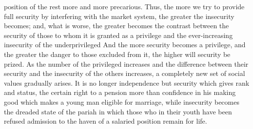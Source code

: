 \documentclass[11pt,openany]{book}
\begin{document}
position of the rest more and more precarious. Thus, the more we try to provide full security by interfering with the market system, the greater the insecurity becomes; and, what is worse, the greater becomes the contrast between the security of those to whom it is granted as a privilege and the ever-increasing insecurity of the underprivileged And the more security becomes a privilege, and the greater the danger to those excluded from it, the higher will security be prized. As the number of the privileged increases and the difference between their security and the insecurity of the others increases, a completely new set of social values gradually arises. It is no longer independence but security which gives rank and status, the certain right to a pension more than confidence in his making good which makes a young man eligible for marriage, while insecurity becomes the dreaded state of the pariah in which those who in their youth have been refused admission to the haven of a salaried position remain for life.

\begin{center}\textasteriskcentered\hspace{0.9em}\textasteriskcentered\hspace{0.9em}\textasteriskcentered\end{center}

\begin{center}\textasteriskcentered\hspace{0.9em}\textasteriskcentered\hspace{0.9em}\textasteriskcentered\end{center}

\begin{center}\textasteriskcentered\hspace{0.9em}\textasteriskcentered\hspace{0.9em}\textasteriskcentered\end{center}

\begin{center}\textasteriskcentered\hspace{0.9em}\textasteriskcentered\hspace{0.9em}\textasteriskcentered\end{center}
\end{document}
